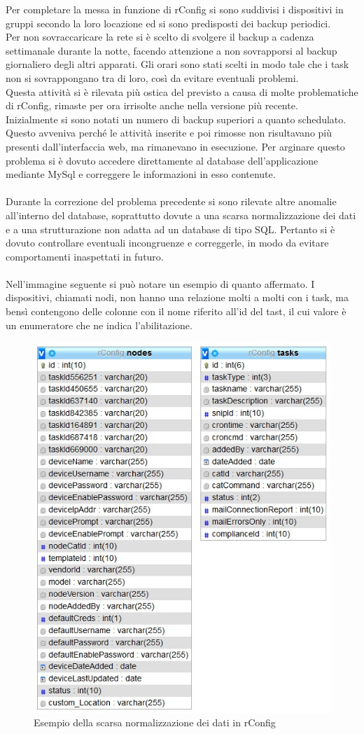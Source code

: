 \documentclass[Realizzazione.tex]{subfiles}
\begin{document}
Per completare la messa in funzione di rConfig si sono suddivisi i dispositivi in gruppi secondo la loro locazione ed si sono predisposti dei backup periodici. \\
Per non sovraccaricare la rete si è scelto di svolgere il backup a cadenza settimanale durante la notte, facendo attenzione a non sovrapporsi al backup giornaliero degli altri apparati. Gli orari sono stati scelti in modo tale che i task non si sovrappongano tra di loro, così da evitare eventuali problemi.\\

Questa attività si è rilevata più ostica del previsto a causa di molte problematiche di rConfig, rimaste per ora irrisolte anche nella versione più recente. \\
Inizialmente si sono notati un numero di backup superiori a quanto schedulato. Questo avveniva perché le attività inserite e poi rimosse non risultavano più presenti dall'interfaccia web, ma rimanevano in esecuzione. Per arginare questo problema si è dovuto accedere direttamente al database dell'applicazione mediante MySql e correggere le informazioni in esso contenute. \\\\
Durante la correzione del problema precedente si sono rilevate altre anomalie all'interno del database, soprattutto dovute a una scarsa normalizzazione dei dati e a una strutturazione non adatta ad un database di tipo SQL. Pertanto si è dovuto controllare eventuali incongruenze e correggerle, in modo da evitare comportamenti inaspettati in futuro. \\\\
Nell'immagine seguente si può notare un esempio di quanto affermato. I dispositivi, chiamati nodi, non hanno una relazione molti a molti con i task, ma bensì contengono delle colonne con il nome riferito all'id del tast, il cui valore è un enumeratore che ne indica l'abilitazione.
\begin{figure}[H]
	\centering
	\includegraphics[width=0.6\linewidth]{"images/rconfig_normalizzazione"}
	\caption{Esempio della scarsa normalizzazione dei dati in rConfig}
	\label{fig:Esempio della scarsa normalizzazione dei dati in rConfig}
\end{figure}
\end{document}

